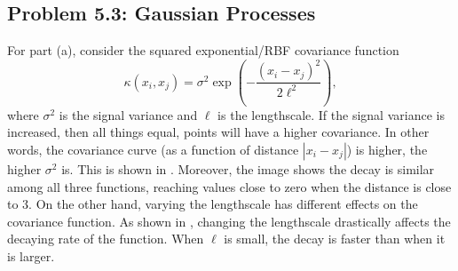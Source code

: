 \documentclass[11pt, english]{article}
\begin{document}
\begin{multicols}{2}
\section*{Problem 5.3: Gaussian Processes}

For part (a), consider the squared exponential/RBF covariance function
	$$\kappa(x_{i}, x_{j}) = \sigma^{2}\exp\left(-\frac{(x_{i} - x_{j})^{2}}{2\ell^{2}}\right),$$
where $\sigma^2$ is the signal variance and $\ell$ is the lengthscale. If the signal variance is increased, then all things equal, points will have a higher covariance. In other words, the covariance curve (as a function of distance $|x_{i} - x_{j}|$) is higher, the higher $\sigma^{2}$ is. This is shown in . Moreover, the image shows the decay is similar among all three functions, reaching values close to zero when the distance is close to 3. On the other hand, varying the lengthscale has different effects on the covariance function. As shown in , changing the lengthscale drastically affects the decaying rate of the function. When $\ell$ is small, the decay is faster than when it is larger.


\end{multicols}
\end{document}
